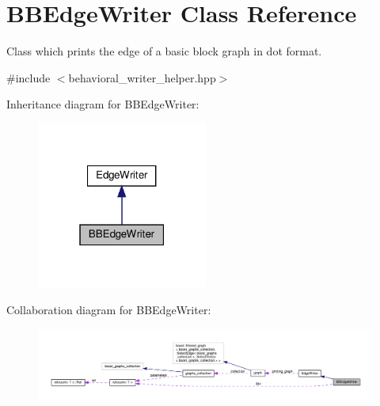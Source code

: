 \hypertarget{classBBEdgeWriter}{}\section{B\+B\+Edge\+Writer Class Reference}
\label{classBBEdgeWriter}


Class which prints the edge of a basic block graph in dot format.  




{\ttfamily \#include $<$behavioral\+\_\+writer\+\_\+helper.\+hpp$>$}



Inheritance diagram for B\+B\+Edge\+Writer\+:
\nopagebreak
\begin{figure}[H]
\begin{center}
\leavevmode
\includegraphics[width=159pt]{db/df8/classBBEdgeWriter__inherit__graph}
\end{center}
\end{figure}


Collaboration diagram for B\+B\+Edge\+Writer\+:
\nopagebreak
\begin{figure}[H]
\begin{center}
\leavevmode
\includegraphics[width=350pt]{d4/d0e/classBBEdgeWriter__coll__graph}
\end{center}
\end{figure}
